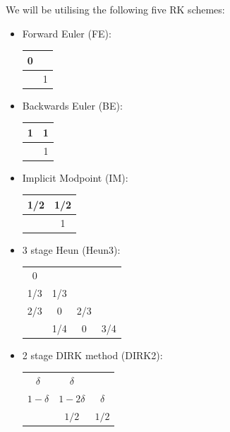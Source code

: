 \documentclass[10pt]{article}
\begin{document}
\newpage
We will be utilising the following five RK schemes:

\begin{itemize}
    \item Forward Euler (FE): $\quad$
\begin{center}
\begin{tabular}{ c|c }
  0 &    \\
  \hline
    & 1  \\
\end{tabular}
\end{center}

\item Backwards Euler (BE): $\quad$
\begin{center}
\begin{tabular}{ c|c }
  1 & 1   \\
  \hline
    & 1  \\
\end{tabular}
\end{center}

\item Implicit Modpoint (IM):
\begin{center}
\begin{tabular}{ c|c }
  1/2 & 1/2   \\
  \hline
    & 1  \\
\end{tabular}
\end{center}

\item 3 stage Heun (Heun3):
\begin{center}
\begin{tabular}{ c|c c c }
  0 & & &   \\
  1/3 & 1/3 & & \\
  2/3 & 0 & 2/3 &  \\
  \hline
    & 1/4 & 0 & 3/4  \\
\end{tabular}
\end{center}

\item 2 stage DIRK method (DIRK2):
\begin{center}
\begin{tabular}{ c|c c  }
  $\delta$ & $\delta$ &    \\
  $1 - \delta$ & $1 - 2\delta$ & $\delta$  \\
  \hline
    & $1/2$ & $1/2$   \\
\end{tabular}
\end{center}
\end{itemize}
\end{document}

